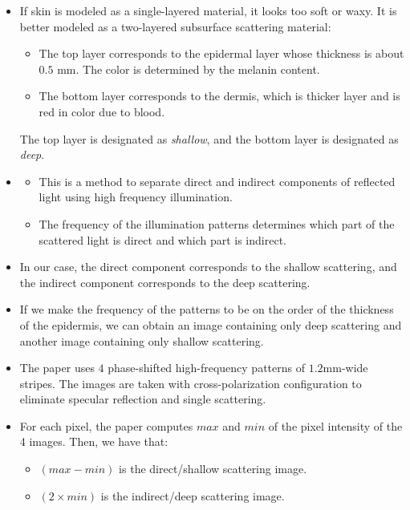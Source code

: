 \documentclass[10pt]{article}
\begin{document}
  	\begin{itemize}
  		\item If skin is modeled as a single-layered material, it looks too soft or waxy. It is better modeled as a two-layered subsurface scattering material:
  		\begin{itemize}
  			\item The top layer corresponds to the epidermal layer whose thickness is about $0.5$ mm.  The color is determined by the melanin content.
  			\item The bottom layer corresponds to the dermis, which is thicker layer and is red in color due to blood.
  		\end{itemize}
  		The top layer is designated as \emph{shallow}, and the bottom layer is designated as \emph{deep}.

  		\item \cite{Nayar:2006}
  		\begin{itemize}
  			\item This is a method to separate direct and indirect components of reflected light using high frequency illumination.

  			\item The frequency of the illumination patterns determines which part of the scattered light is direct and which part is indirect. 
  		\end{itemize}

  		\item In our case, the direct component corresponds to the shallow scattering, and the indirect component corresponds to the deep scattering.

  		\item If we make the frequency of the patterns to be on the order of the thickness of the epidermis, we can obtain an image containing only deep scattering and another image containing only shallow scattering.

  		\item The paper uses $4$ phase-shifted high-frequency patterns of $1.2$mm-wide stripes.  The images are taken with cross-polarization configuration to eliminate specular reflection and single scattering.

  		\item For each pixel, the paper computes $max$ and $min$ of the pixel intensity of the 4 images.  Then, we have that:
  		\begin{itemize}
  			\item $(max-min)$ is the direct/shallow scattering image.
  			\item $(2 \times min)$ is the indirect/deep scattering image.
  		\end{itemize}


\end{itemize}
\end{document}
